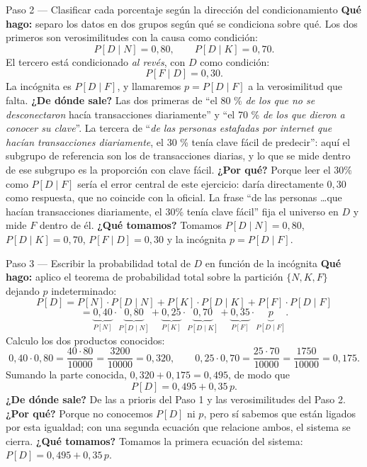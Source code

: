 \documentclass[11pt]{article}
\begin{document}
\begin{sol}
\begin{paso}{Paso 2 --- Clasificar cada porcentaje seg\'un la direcci\'on del condicionamiento}
\textbf{Qu\'e hago:} separo los datos en dos grupos seg\'un qu\'e se condiciona sobre qu\'e. Los dos primeros son verosimilitudes con la causa como condici\'on:
\[
P[D\mid N]=0{,}80,\qquad P[D\mid K]=0{,}70 .
\]
El tercero est\'a condicionado \emph{al rev\'es}, con $D$ como condici\'on:
\[
P[F\mid D]=0{,}30 .
\]
La inc\'ognita es $P[D\mid F]$, y llamaremos $p=P[D\mid F]$ a la verosimilitud que falta.
\textbf{¿De d\'onde sale?} Las dos primeras de ``el 80 \% \emph{de los que no se desconectaron} hac\'ia transacciones diariamente'' y ``el 70 \% \emph{de los que dieron a conocer su clave}''. La tercera de ``\emph{de las personas estafadas por internet que hac\'ian transacciones diariamente}, el 30 \% ten\'ia clave f\'acil de predecir'': aqu\'i el subgrupo de referencia son los de transacciones diarias, y lo que se mide dentro de ese subgrupo es la proporci\'on con clave f\'acil.
\textbf{¿Por qu\'e?} Porque leer el $30\%$ como $P[D\mid F]$ ser\'ia el error central de este ejercicio: dar\'ia directamente $0{,}30$ como respuesta, que no coincide con la oficial. La frase ``de las personas \dots que hac\'ian transacciones diariamente, el $30\%$ ten\'ia clave f\'acil'' fija el universo en $D$ y mide $F$ dentro de \'el.
\textbf{¿Qu\'e tomamos?} Tomamos $P[D\mid N]=0{,}80$, $P[D\mid K]=0{,}70$, $P[F\mid D]=0{,}30$ y la inc\'ognita $p=P[D\mid F]$.
\end{paso}

\begin{paso}{Paso 3 --- Escribir la probabilidad total de $D$ en funci\'on de la inc\'ognita}
\textbf{Qu\'e hago:} aplico el teorema de probabilidad total sobre la partici\'on $\{N,K,F\}$ dejando $p$ indeterminado:
\[
P[D]=P[N]\cdot P[D\mid N]+P[K]\cdot P[D\mid K]+P[F]\cdot P[D\mid F]
\]
\[
=\underbrace{0{,}40}_{P[N]}\cdot\underbrace{0{,}80}_{P[D\mid N]}
+\underbrace{0{,}25}_{P[K]}\cdot\underbrace{0{,}70}_{P[D\mid K]}
+\underbrace{0{,}35}_{P[F]}\cdot\underbrace{p}_{P[D\mid F]} .
\]
Calculo los dos productos conocidos:
\[
0{,}40\cdot 0{,}80=\frac{40\cdot 80}{10000}=\frac{3200}{10000}=0{,}320,
\qquad
0{,}25\cdot 0{,}70=\frac{25\cdot 70}{10000}=\frac{1750}{10000}=0{,}175 .
\]
Sumando la parte conocida, $0{,}320+0{,}175=0{,}495$, de modo que
\[
P[D]=0{,}495+0{,}35\,p .
\]
\textbf{¿De d\'onde sale?} De las a prioris del Paso 1 y las verosimilitudes del Paso 2.
\textbf{¿Por qu\'e?} Porque no conocemos $P[D]$ ni $p$, pero s\'i sabemos que est\'an ligados por esta igualdad; con una segunda ecuaci\'on que relacione ambos, el sistema se cierra.
\textbf{¿Qu\'e tomamos?} Tomamos la primera ecuaci\'on del sistema: $P[D]=0{,}495+0{,}35\,p$.
\end{paso}


\end{sol}
\end{document}
